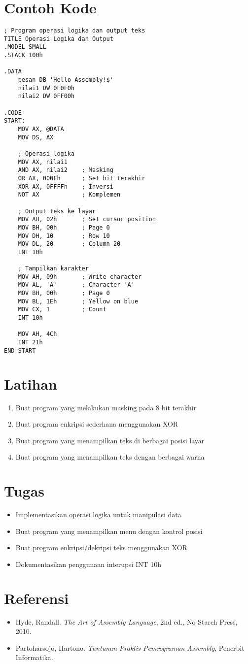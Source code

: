 \section{Contoh Kode}
\begin{verbatim}
; Program operasi logika dan output teks
TITLE Operasi Logika dan Output
.MODEL SMALL
.STACK 100h

.DATA
    pesan DB 'Hello Assembly!$'
    nilai1 DW 0F0F0h
    nilai2 DW 0FF00h

.CODE
START:
    MOV AX, @DATA
    MOV DS, AX
    
    ; Operasi logika
    MOV AX, nilai1
    AND AX, nilai2    ; Masking
    OR AX, 000Fh      ; Set bit terakhir
    XOR AX, 0FFFFh    ; Inversi
    NOT AX            ; Komplemen
    
    ; Output teks ke layar
    MOV AH, 02h       ; Set cursor position
    MOV BH, 00h       ; Page 0
    MOV DH, 10        ; Row 10
    MOV DL, 20        ; Column 20
    INT 10h
    
    ; Tampilkan karakter
    MOV AH, 09h       ; Write character
    MOV AL, 'A'       ; Character 'A'
    MOV BH, 00h       ; Page 0
    MOV BL, 1Eh       ; Yellow on blue
    MOV CX, 1         ; Count
    INT 10h
    
    MOV AH, 4Ch
    INT 21h
END START
\end{verbatim}

\section{Latihan}
\begin{enumerate}
\item Buat program yang melakukan masking pada 8 bit terakhir
\item Buat program enkripsi sederhana menggunakan XOR
\item Buat program yang menampilkan teks di berbagai posisi layar
\item Buat program yang menampilkan teks dengan berbagai warna
\end{enumerate}

\section{Tugas}
\begin{itemize}
\item Implementasikan operasi logika untuk manipulasi data
\item Buat program yang menampilkan menu dengan kontrol posisi
\item Buat program enkripsi/dekripsi teks menggunakan XOR
\item Dokumentasikan penggunaan interupsi INT 10h
\end{itemize}

\section{Referensi}
\begin{itemize}
\item Hyde, Randall. \textit{The Art of Assembly Language}, 2nd ed., No Starch Press, 2010.
\item Partoharsojo, Hartono. \textit{Tuntunan Praktis Pemrograman Assembly}, Penerbit Informatika.
\end{itemize}

